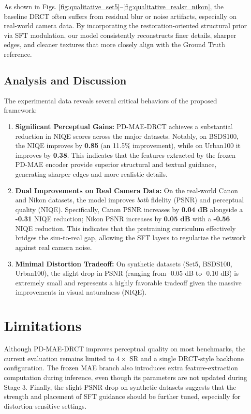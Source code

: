 \documentclass[journal,10pt,doublecolumn]{IEEEtran}
\begin{document}
As shown in Figs. \ref{fig:qualitative_set5}--\ref{fig:qualitative_realsr_nikon}, the baseline DRCT often suffers from residual blur or noise artifacts, especially on real-world camera data. By incorporating the restoration-oriented structural prior via SFT modulation, our model consistently reconstructs finer details, sharper edges, and cleaner textures that more closely align with the Ground Truth reference.


\subsection{Analysis and Discussion}
The experimental data reveals several critical behaviors of the proposed framework:
\begin{enumerate}
    \item \textbf{Significant Perceptual Gains:} PD-MAE-DRCT achieves a substantial reduction in NIQE scores across the major datasets. Notably, on BSDS100, the NIQE improves by \textbf{0.85} (an 11.5\% improvement), while on Urban100 it improves by \textbf{0.38}. This indicates that the features extracted by the frozen PD-MAE encoder provide superior structural and textual guidance, generating sharper edges and more realistic details.
    \item \textbf{Dual Improvements on Real Camera Data:} On the real-world Canon and Nikon datasets, the model improves \textit{both} fidelity (PSNR) and perceptual quality (NIQE). Specifically, Canon PSNR increases by \textbf{0.04 dB} alongside a \textbf{-0.31} NIQE reduction; Nikon PSNR increases by \textbf{0.05 dB} with a \textbf{-0.56} NIQE reduction. This indicates that the pretraining curriculum effectively bridges the sim-to-real gap, allowing the SFT layers to regularize the network against real camera noise.
    \item \textbf{Minimal Distortion Tradeoff:} On synthetic datasets (Set5, BSDS100, Urban100), the slight drop in PSNR (ranging from -0.05 dB to -0.10 dB) is extremely small and represents a highly favorable tradeoff given the massive improvements in visual naturalness (NIQE).
\end{enumerate}

\section{Limitations}
Although PD-MAE-DRCT improves perceptual quality on most benchmarks, the current evaluation remains limited to $4\times$ SR and a single DRCT-style backbone configuration. The frozen MAE branch also introduces extra feature-extraction computation during inference, even though its parameters are not updated during Stage 3. Finally, the slight PSNR drop on synthetic datasets suggests that the strength and placement of SFT guidance should be further tuned, especially for distortion-sensitive settings.
\end{document}
